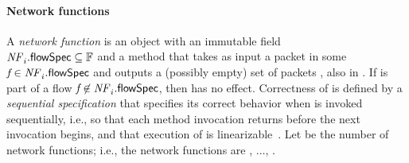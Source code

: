 \paragraph{Network functions}
A \textit{network function} \nfID{\nfIdx} is an object with an
immutable field \\
$\nfID{\nfIdx}{}{\flowSpec} \subseteq \flowSpace$ and
a method \nfID{\nfIdx}{}{\processPkt} that takes as input a packet
\pktID{} in some $\flowID{} \in \nfID{\nfIdx}{}{\flowSpec}$ and
outputs a (possibly empty) set of packets \pktSet{}, also in
\flowID{}.  If \pktID{} is part of a flow $\flowID{} \not\in
\nfID{\nfIdx}{}{\flowSpec}$, then
\nfID{\nfIdx}{}{\processPkt{\pktID{}}} has no effect.  Correctness of
\nfID{\nfIdx} is defined by a \textit{sequential specification} that
specifies its correct behavior when \nfID{\nfIdx}{}{\processPkt} is
invoked sequentially, i.e., so that each method invocation returns
before the next invocation begins, and that execution of
\nfID{\nfIdx}{}{\processPkt} is
linearizable~\cite{herlihy1990:linearizability}.  Let \nfNmbr be the
number of network functions; i.e., the network functions are ,
$\ldots$, \nfID{\nfNmbr}.




